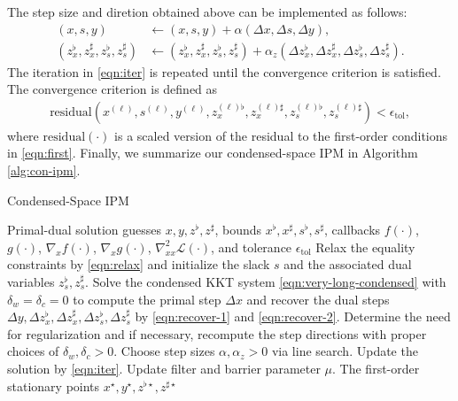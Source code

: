 The step size and diretion obtained above can be implemented as follows:
\begin{align}
  (x,s,y) &\leftarrow (x,s,y)+ \alpha (\Delta x, \Delta s, \Delta y),\label{eqn:iter}\\\nonumber
  (z_x^\flat, z_x^\sharp, z_s^\flat, z_s^\sharp) &\leftarrow (z_x^\flat, z_x^\sharp, z_s^\flat, z_s^\sharp) + \alpha_z (\Delta z_x^\flat, \Delta z_x^\sharp, \Delta z_s^\flat, \Delta z_s^\sharp).
\end{align}
The iteration in \eqref{eqn:iter} is repeated until the convergence
criterion is satisfied. The convergence criterion is defined as
\begin{align}\label{eqn:criteria}
\text{residual}(x^{(\ell)}, s^{(\ell)}, y^{(\ell)},
z^{(\ell)\flat}_x, z^{(\ell)\sharp}_x, z^{(\ell)\flat}_s,
z^{(\ell)\sharp}_s) <\epsilon_{\text{tol}},
\end{align}
where
$\text{residual}(\cdot)$ is a scaled version of the residual to the
first-order conditions in \eqref{eqn:first}. Finally, we summarize our
condensed-space IPM in Algorithm \ref{alg:con-ipm}.

\begin{algorithm}[t]
  \caption{Condensed-Space IPM}
  \label{alg:con-ipm}
  \begin{algorithmic}[1]
    \REQUIRE Primal-dual solution guesses $x,y, z^\flat, z^\sharp$, bounds $x^\flat,x^\sharp, s^\flat, s^\sharp$, callbacks $f(\cdot)$, $g(\cdot)$, $\nabla_x f(\cdot)$, $\nabla_x g(\cdot)$, $\nabla^2_{xx} \mathcal{L}(\cdot)$, and tolerance $\epsilon_{\text{tol}}$
    \STATE Relax the equality constraints by \eqref{eqn:relax} and initialize the slack $s$ and the associated dual variables $z^\flat_s, z^\sharp_s$.
    \STATE Solve the condensed KKT system \eqref{eqn:very-long-condensed} with $\delta_w=\delta_c=0$ to compute the primal step $\Delta x$ and recover the dual steps $\Delta y, \Delta z_x^\flat, \Delta z_x^\sharp, \Delta z_s^\flat, \Delta z_s^\sharp$ by \eqref{eqn:recover-1} and \eqref{eqn:recover-2}.
    \STATE Determine the need for regularization and if necessary, recompute the step directions with proper choices of $\delta_w,\delta_c>0$.
    \STATE Choose step sizes $\alpha,\alpha_z>0$ via line search.
    \STATE Update the solution by \eqref{eqn:iter}.
    \STATE Update filter and barrier parameter $\mu$.
    \ENDWHILE
    \RETURN The first-order stationary points $x^\star,y^\star, z^{\flat\star}, z^{\sharp\star}$
  \end{algorithmic}
\end{algorithm}

